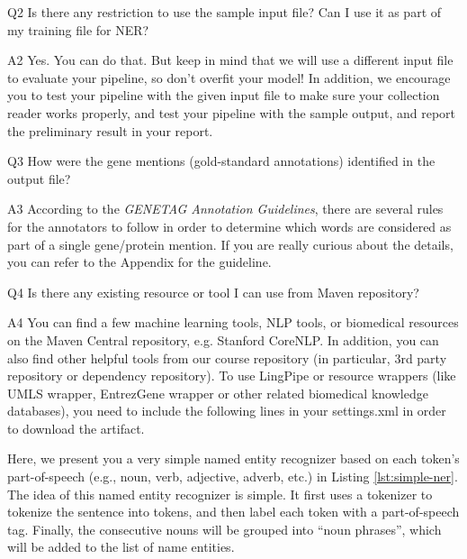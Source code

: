 \begin{qa}
\item[Q2] Is there any restriction to use the sample input file? Can I use it
as part of my training file for NER?

\item[A2] Yes. You can do that. But keep in mind that we will use a different
input file to evaluate your pipeline, so don't overfit your model! In addition,
we encourage you to test your pipeline with the given input file to make sure
your collection reader works properly, and test your pipeline with the sample
output, and report the preliminary result in your report.

\item[Q3] How were the gene mentions (gold-standard annotations) identified in
the output file?

\item[A3] According to the \emph{GENETAG Annotation Guidelines}, there are
several rules for the annotators to follow in order to determine which words are
considered as part of a single gene/protein mention. If you are really curious
about the details, you can refer to the Appendix for the guideline.

\item[Q4] Is there any existing resource or tool I can use from Maven
repository?
 
\item[A4] You can find a few machine learning tools, NLP tools, or biomedical
resources on the Maven Central repository, e.g. Stanford CoreNLP. In addition,
you can also find other helpful tools from our course repository (in particular,
3rd party repository or dependency repository). To use LingPipe or resource
wrappers (like UMLS wrapper, EntrezGene wrapper or other related biomedical
knowledge databases), you need to include the following lines in your
settings.xml in order to download the artifact.

\end{qa}



Here, we present you a very simple named entity recognizer based on each token's
part-of-speech (e.g., noun, verb, adjective, adverb, etc.) in Listing
\ref{lst:simple-ner}. The idea of this named entity recognizer is simple. It
first uses a tokenizer to tokenize the sentence into tokens, and then label each
token with a part-of-speech tag. Finally, the consecutive nouns will be grouped
into ``noun phrases'', which will be added to the list of name entities.

